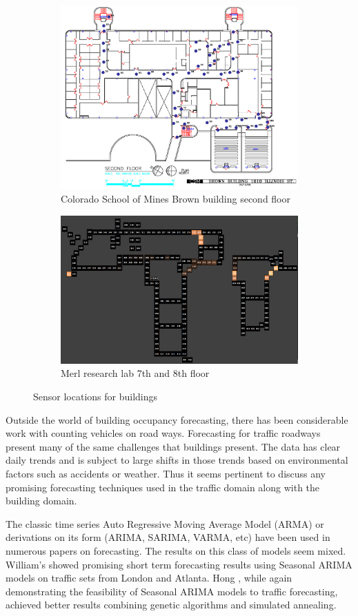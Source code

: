 \documentclass{acm_proc_article-sp}
\begin{document}
\begin{figure}[t!]
\centering
\begin{subfigure}{.4\textwidth}
  \centering
  \includegraphics[width=.5\linewidth]{bb_floor2_sensors_old.png}
  \caption{Colorado School of Mines Brown building second floor}
  \label{fig:sub1}
\end{subfigure}
\begin{subfigure}{.4\textwidth}
  \centering
  \includegraphics[width=.5\linewidth]{merl_map.png}
  \caption{Merl research lab 7th and 8th floor}
  \label{fig:sub2}
\end{subfigure}
\caption{Sensor locations for buildings}
\label{fig:test}
\end{figure}


Outside the world of building occupancy forecasting, there has been considerable work with counting vehicles on road ways.  Forecasting for traffic roadways present many of the same challenges that buildings present.  The data has clear daily trends and is subject to large shifts in those trends based on environmental factors such as accidents or weather.  Thus it seems pertinent to discuss any promising forecasting techniques used in the traffic domain along with the building domain.

The classic time series Auto Regressive Moving Average Model (ARMA) or derivations on its form (ARIMA, SARIMA, VARMA, etc) have been used in numerous papers on forecasting.  The results on this class of models seem mixed.  William's \cite{Williams2003} showed promising short term forecasting results using Seasonal ARIMA models on traffic sets from London and Atlanta.  Hong \cite{Hong2011} , while again demonstrating the feasibility of Seasonal ARIMA models to traffic forecasting, achieved better results combining genetic algorithms and simulated annealing.  
\end{document}
